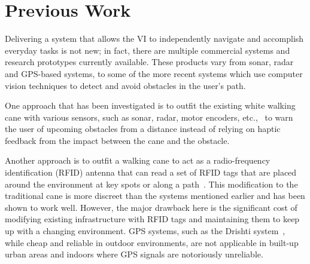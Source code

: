 \documentclass[format=sigconf, review=true, screen=true, anonymous=true]{acmart}
\begin{document}
\section{Previous Work}
\label{sec:lit-review}



Delivering a system that allows the VI to independently navigate and accomplish everyday tasks is not new; in fact, there are multiple commercial systems and research prototypes currently available. These products vary from sonar, radar and GPS-based systems, to some of the more recent systems which use computer vision techniques to detect and avoid obstacles in the user's path. 

One approach that has been investigated is to outfit the existing white walking cane with various sensors, such as sonar, radar, motor encoders, etc.,~\cite{ulrich1997, marion2008batcane} to warn the user of upcoming obstacles from a distance instead of relying on haptic feedback from the impact between the cane and the obstacle. %

Another approach is to outfit a walking cane to act as a radio-frequency identification (RFID) antenna that can read a set of RFID tags that are placed around the environment at key spots or along a path~\cite{faria2010electronic, willis2005}. This modification to the traditional cane is more discreet than the systems mentioned earlier and has been shown to work well. However, the major drawback here is the significant cost of modifying existing infrastructure with RFID tags and maintaining them to keep up with a changing environment. GPS systems, such as the Drishti system~\cite{ran2004drishti}, while cheap and reliable in outdoor environments, are not applicable in built-up urban areas and indoors where GPS signals are notoriously unreliable. 
\end{document}
